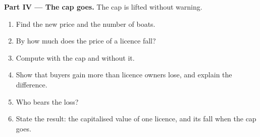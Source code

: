 \begin{problem}
\medskip\noindent\textbf{Part IV --- The cap goes.} The cap is lifted without warning.
\begin{enumerate}[resume]
  \item Find the new price and the number of boats.
  \item By how much does the price of a licence fall?
  \item Compute  with the cap and without it.
  \item Show that buyers gain more than licence owners lose, and explain the difference.
  \item Who bears the loss?
  \item State the result: the capitalised value of one licence, and its fall when the cap goes.
\end{enumerate}
\end{problem}
